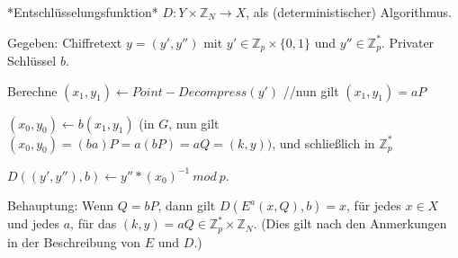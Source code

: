 \documentclass[a4paper]{article}
\begin{document}
\begin{multicols}{3}
        *Entschlüsselungsfunktion* $D:Y\times\mathbb{Z}_N \rightarrow X$, als (deterministischer) Algorithmus.
        \begin{itemize*}
            \item Gegeben: Chiffretext $y=(y',y'')$ mit $y'\in\mathbb{Z}_p\times\{0,1\}$ und $y''\in\mathbb{Z}^*_p$. Privater Schlüssel $b$.
            \item Berechne $(x_1,y_1)\leftarrow Point-Decompress (y')$ //nun gilt $(x_1,y_1) =aP$
            \item $(x_0,y_0)\leftarrow b(x_1,y_1)$ (in $G$, nun gilt $(x_0,y_0) = (ba)P=a(bP) =aQ= (k,y))$, und schließlich in $\mathbb{Z}^*_p$
            \item $D((y',y''),b)\leftarrow y''*(x_0)^{-1}\ mod\ p$.
        \end{itemize*}

        Behauptung: Wenn $Q=bP$, dann gilt $D(E^a (x,Q),b) =x$, für jedes $x\in X$ und jedes $a$, für das $(k,y) =aQ\in\mathbb{Z}^*_p \times\mathbb{Z}_N$. (Dies gilt nach den Anmerkungen in der Beschreibung von $E$ und $D$.)

\end{multicols}
\end{document}
